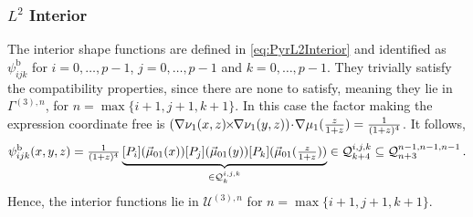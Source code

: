 \subsubsection{\texorpdfstring{$L^2$}{L2} Interior}
The interior shape functions are defined in \eqref{eq:PyrL2Interior} and identified as $\psi_{ijk}^\mathrm{b}$ for $i=0,\ldots,p-1$, $j=0,\ldots,p-1$ and $k=0,\ldots,p-1$. 
They trivially satisfy the compatibility properties, since there are none to satisfy, meaning they lie in $\Gamma^{(3),n}$, for $n=\max\{i+1,j+1,k+1\}$.
In this case the factor making the expression coordinate free is $(\nabla\nu_1(x,z)\!\!\times\!\!\nabla\nu_1(y,z))\!\cdot\!\nabla\mu_1(\textstyle{\frac{z}{1+z}})=\frac{1}{(1+z)^4}$.
It follows,
\begin{equation}
	\psi_{ijk}^\mathrm{b}(x,y,z)
		=\textstyle{\frac{1}{(1+z)^4}}\underbrace{[P_i](\vec{\mu}_{01}(x))[P_j](\vec{\mu}_{01}(y))[P_k](\vec{\mu}_{01}(\textstyle{\frac{z}{1+z}}))}_{
			\in\mathcal{Q}_{k}^{i,j,k}}\in\mathcal{Q}_{k+4}^{i,j,k}\subseteq\mathcal{Q}_{n+3}^{n-1,n-1,n-1}\,.
\end{equation}
Hence, the interior functions lie in $\mathcal{U}^{(3),n}$ for $n=\max\{i+1,j+1,k+1\}$.




